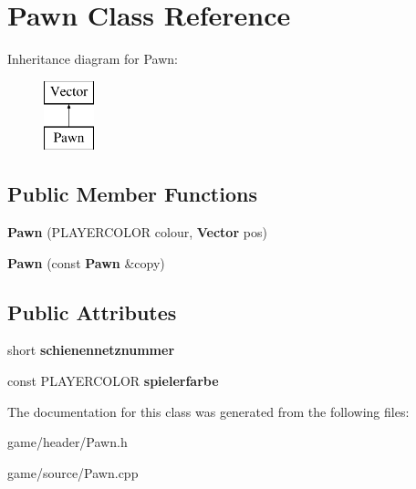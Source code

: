 \section{Pawn Class Reference}
\label{class_pawn}
Inheritance diagram for Pawn\-:\begin{figure}[H]
\begin{center}
\leavevmode
\includegraphics[height=2.000000cm]{class_pawn}
\end{center}
\end{figure}
\subsection*{Public Member Functions}
\begin{DoxyCompactItemize}
\item 
{\bfseries Pawn} (P\-L\-A\-Y\-E\-R\-C\-O\-L\-O\-R colour, {\bf Vector} pos)\label{class_pawn_a0edb7824a9ebc6d83f3836ed66c769f5}

\item 
{\bfseries Pawn} (const {\bf Pawn} \&copy)\label{class_pawn_a512724e66a28f71702973bcd87bd883b}

\end{DoxyCompactItemize}
\subsection*{Public Attributes}
\begin{DoxyCompactItemize}
\item 
short {\bfseries schienennetznummer}\label{class_pawn_a8f02932d671c756305cbe3959104d5bf}

\item 
const P\-L\-A\-Y\-E\-R\-C\-O\-L\-O\-R {\bfseries spielerfarbe}\label{class_pawn_a5e5204e3877b774744df1b5aeca2fb92}

\end{DoxyCompactItemize}


The documentation for this class was generated from the following files\-:\begin{DoxyCompactItemize}
\item 
game/header/Pawn.\-h\item 
game/source/Pawn.\-cpp\end{DoxyCompactItemize}
